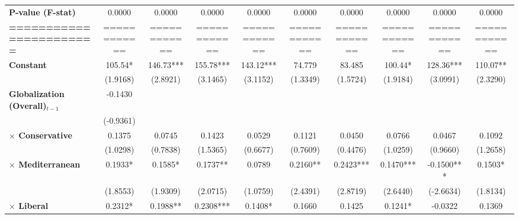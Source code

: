 \begin{center}
\begin{tabular}{lccccccccc}
\textbf{P-value (F-stat)}          &     0.0000     &      0.0000      &      0.0000      &      0.0000      &      0.0000      &      0.0000      &      0.0000      &      0.0000      &      0.0000       \\
\textbf{=======================}   &  ============  &   ============   &   ============   &   ============   &   ============   &   ============   &   ============   &   ============   &   ============    \\
\textbf{Constant}                     &    105.54*     &    146.73***     &    155.78***     &    143.12***     &      74.779      &      83.485      &     100.44*      &    128.36***     &     110.07**      \\
\textbf{ }                         &    (1.9168)    &     (2.8921)     &     (3.1465)     &     (3.1152)     &     (1.3349)     &     (1.5724)     &     (1.9184)     &     (3.0991)     &     (2.3290)      \\
\textbf{Globalization (Overall)$_{t-1}$}               &    -0.1430     &                  &                  &                  &                  &                  &                  &                  &                   \\
\textbf{ }                         &   (-0.9361)    &                  &                  &                  &                  &                  &                  &                  &                   \\
\textbf{$\times$ Conservative}         &     0.1375     &      0.0745      &      0.1423      &      0.0529      &      0.1121      &      0.0450      &      0.0766      &      0.0467      &      0.1092       \\
\textbf{ }                         &    (1.0298)    &     (0.7838)     &     (1.5365)     &     (0.6677)     &     (0.7609)     &     (0.4476)     &     (1.0259)     &     (0.9660)     &     (1.2658)      \\
\textbf{$\times$ Mediterranean}        &    0.1933*     &     0.1585*      &     0.1737**     &      0.0789      &     0.2160**     &    0.2423***     &    0.1470***     &    -0.1500***    &     0.1503*       \\
\textbf{ }                         &    (1.8553)    &     (1.9309)     &     (2.0715)     &     (1.0759)     &     (2.4391)     &     (2.8719)     &     (2.6440)     &    (-2.6634)     &     (1.8134)      \\
\textbf{$\times$ Liberal}              &    0.2312*     &     0.1988**     &    0.2308***     &     0.1408*      &      0.1660      &      0.1425      &     0.1241*      &     -0.0322      &      0.1369       \\

\end{tabular}
\end{center}
